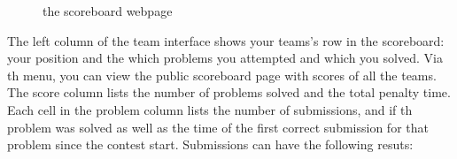 \documentclass[a4paper]{article}
\begin{document}
\begin{figure}[p]
    \centering
    \caption{the scoreboard webpage}
    \label{fig:team-scoreboard}
\end{figure}

The left column of the team interface shows your teams's row in the scoreboard: your position and the which problems you attempted and which you solved. Via th menu, you can view the public scoreboard page with scores of all the teams. The score column lists the number of problems solved and the total penalty time. Each cell in the problem column lists the number of submissions, and if th problem was solved as well as the time of the first correct submission for that problem since the contest start. Submissions can have the following resuts:
\end{document}
